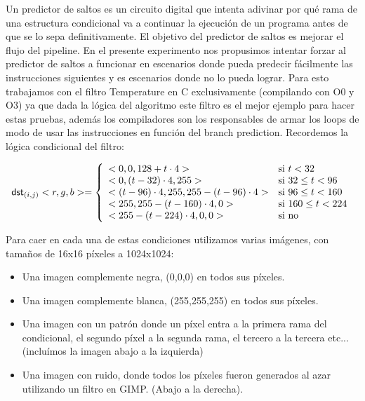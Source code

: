 Un predictor de saltos es un circuito digital que intenta adivinar por qué rama de una estructura condicional va a continuar la ejecución de un programa antes de que se lo sepa definitivamente. El objetivo del predictor de saltos es mejorar el flujo del pipeline. En el presente experimento nos propusimos intentar forzar al predictor de saltos a funcionar en escenarios donde pueda predecir fácilmente las instrucciones siguientes y es escenarios donde no lo pueda lograr. Para esto trabajamos con el filtro Temperature en C exclusivamente (compilando con O0 y O3) ya que dada la lógica del algoritmo este filtro es el mejor ejemplo para hacer estas pruebas, además los compiladores son los responsables de armar los loops de modo de usar las instrucciones en función del branch prediction. Recordemos la lógica condicional del filtro:
\begin{center}
	\begin{displaymath}
	\mathsf{dst}_{(i,j)}<r,g,b> = \left\{
	\begin{array}{l l}
				<0,0, 128 + t \cdot 4> & \text{si }t < 32\\
				<0, (t - 32) \cdot 4, 255> & \text{si }32 \le t < 96\\
				<(t-96) \cdot 4, 255, 255 - (t-96) \cdot 4> & \text{si }96 \le t < 160\\
				<255, 255 - (t - 160) \cdot 4, 0> & \text{si }160 \le t < 224\\
				<255 - (t - 224) \cdot 4, 0 , 0> & \text{si no} \\
	\end{array}
	\right.
	\end{displaymath}
	\end{center}

Para caer en cada una de estas condiciones utilizamos varias imágenes, con tamaños de 16x16 píxeles a 1024x1024:

\begin{itemize}
	\item Una imagen complemente negra, (0,0,0) en todos sus píxeles.
	\item Una imagen complemente blanca, (255,255,255) en todos sus píxeles.
	\item Una imagen con un patrón donde un píxel entra a la primera rama del condicional, el segundo píxel a la segunda rama, el tercero a la tercera etc... (incluímos la imagen abajo a la izquierda)
	\item Una imagen con ruido, donde todos los píxeles fueron generados al azar utilizando un filtro en GIMP. (Abajo a la derecha).
\end{itemize}

